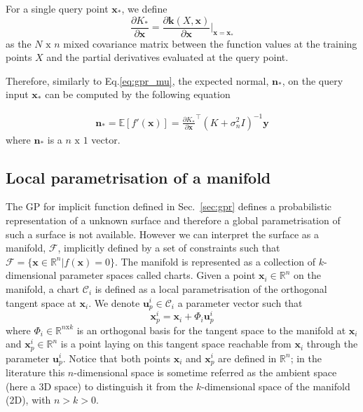 For a single query point $\mathbf{x}_*$, we define 
$$
\frac{\partial K_*}{\partial\mathbf{x}}=\frac{\partial\mathbf{k}(X,\mathbf{x})}{\partial\mathbf{x}}\bigg|_{\mathbf{x}=\mathbf{x}_*}
$$ 
as the $N\text{ x }n$ mixed covariance matrix between the function values at the training points $X$ and the partial derivatives evaluated at the query point. 

Therefore, similarly to Eq.\ref{eq:gpr_mu}, the expected normal, $\mathbf{n}_*$, on the query input $\mathbf{x}_*$ can be computed by the following equation

\begin{eqnarray}
\label{eq:gpr_n}
\mathbf{n}_*=\mathbb{E}[f'(\mathbf{x})]=\frac{\partial K_*}{\partial\mathbf{x}}^\top(K+\sigma_n^2I)^{-1}\mathbf{y}
\end{eqnarray}
where $\mathbf{n}_*$ is a $n\text{ x }1$ vector.

\subsection{Local parametrisation of a manifold}\label{sec:atlas}


The GP for implicit function defined in Sec.~\ref{sec:gpr} defines a probabilistic representation of a unknown surface and therefore a global parametrisation of such a surface is not available. However we can interpret the surface as a manifold, $\mathcal{F}$, implicitly defined by a set of constraints such that $\mathcal{F}=\{\mathbf{x}\in\mathbb{R}^n|f(\mathbf{x})=0\}$. The manifold is represented as a collection of $k$-dimensional parameter spaces called charts.
Given a point $\mathbf{x}_i\in\mathbb{R}^n$ on the manifold, a chart $\mathcal{C}_i$ is defined as a local parametrisation of the orthogonal tangent space at $\mathbf{x}_i$. We denote $\mathbf{u}_p^i\in\mathcal{C}_i$ a parameter vector such that 
\begin{equation}
\label{eq:psi}
\mathbf{x}_p^i=\mathbf{x}_i+\Phi_i\mathbf{u}_p^i
\end{equation}
where $\Phi_i\in\mathbb{R}^{n\text{x}k}$ is an orthogonal basis for the tangent space to the manifold at $\mathbf{x}_i$ and $\mathbf{x}_p^i\in\mathbb{R}^n$ is a point laying on this tangent space reachable from $\mathbf{x}_i$ through the parameter $\mathbf{u}_p^i$. Notice that both points $\mathbf{x}_i$ and $\mathbf{x}_p^i$ are defined in $\mathbb{R}^n$; in the literature this $n$-dimensional space is sometime referred as the ambient space (here a 3D space) to distinguish it from the $k$-dimensional space of the manifold (2D), with $n > k > 0$.

